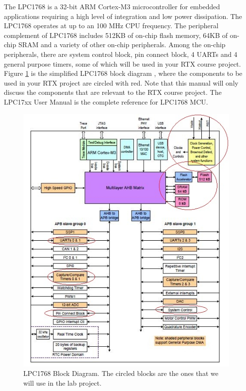 The LPC1768 is a 32-bit ARM Cortex-M3 microcontroller for embedded applications requiring a high level of integration and low power dissipation. 
The LPC1768 operates at up to an 100 MHz CPU frequency. 
The peripheral complement of LPC1768 includes 512KB of on-chip flash memory, 64KB of on-chip SRAM and a variety of other on-chip peripherals. 
Among the on-chip peripherals, there are system control block, pin connect block, 4 UARTs and 4 general purpose timers, some of which will be used in your RTX  course project.
Figure \ref{fig_lpc1768_block} is the simplified LPC1768 block diagram \cite{nxp.lpc17xx.manual}, where the components to be used in your RTX project are circled with red.  
Note that this manual will only discuss the components that are relevant to the RTX course project. The LPC17xx User Manual is the complete reference for LPC1768 MCU.

\begin{figure}
\centerline{\includegraphics[width=5in]{figure/lpc1768_block_diagram_circled}}
\caption[LPC1768 Block Diagram] {LPC1768 Block Diagram. The circled blocks are the ones that we will use in the lab project.}
\label{fig_lpc1768_block}
\end{figure}


